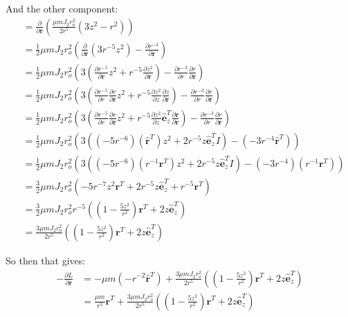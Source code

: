 \documentclass[titlepage]{article}
\begin{document}
And the other component:
\begin{equation}
	\begin{split}
		&=\frac{\partial}{\partial\boldsymbol{r}}\left(\frac{\mu mJ_2r_o^2}{2r^5}\left(3z^2-r^2\right)\right)\\
		&=\frac{1}{2}\mu mJ_2r_o^2\left(\frac{\partial}{\partial\boldsymbol{r}}\left(3r^{-5}z^2\right)-\frac{\partial r^{-3}}{\partial\boldsymbol{r}}\right) \\
		&=\frac{1}{2}\mu mJ_2r_o^2\left(3\left(\frac{\partial r^{-5}}{\partial\boldsymbol{r}}z^2+r^{-5}\frac{\partial z^2}{\partial\boldsymbol{r}}\right)-\frac{\partial r^{-3}}{\partial r}\frac{\partial r}{\partial\boldsymbol{r}}\right) \\
		&=\frac{1}{2}\mu mJ_2r_o^2\left(3\left(\frac{\partial r^{-5}}{\partial r}\frac{\partial r}{\partial\boldsymbol{r}}z^2+r^{-5}\frac{\partial z^2}{\partial z}\frac{\partial z}{\partial\boldsymbol{r}}\right)-\frac{\partial r^{-3}}{\partial r}\frac{\partial r}{\partial\boldsymbol{r}}\right) \\
		&=\frac{1}{2}\mu mJ_2r_o^2\left(3\left(\frac{\partial r^{-5}}{\partial r}\frac{\partial r}{\partial\boldsymbol{r}}z^2+r^{-5}\frac{\partial z^2}{\partial z}\hat{\boldsymbol{e}}_z^T\frac{\partial\boldsymbol{r}}{\partial\boldsymbol{r}}\right)-\frac{\partial r^{-3}}{\partial r}\frac{\partial r}{\partial\boldsymbol{r}}\right) \\
		&=\frac{1}{2}\mu mJ_2r_o^2\left(3\left((-5r^{-6})(\hat{\boldsymbol{r}}^T)z^2+2r^{-5}z\hat{\boldsymbol{e}}_z^TI\right)-(-3r^{-4}\hat{\boldsymbol{r}}^T)\right) \\
		&=\frac{1}{2}\mu mJ_2r_o^2\left(3\left((-5r^{-6})(r^{-1}\boldsymbol{r}^T)z^2+2r^{-5}z\hat{\boldsymbol{e}}_z^TI\right)-(-3r^{-4})(r^{-1}\boldsymbol{r}^T)\right) \\
		&=\frac{3}{2}\mu mJ_2r_o^2\left(-5r^{-7}z^2\boldsymbol{r}^T+2r^{-5}z\hat{\boldsymbol{e}}_z^T+r^{-5}\boldsymbol{r}^T\right) \\
		&=\frac{3}{2}\mu mJ_2r_o^2r^{-5}\left(\left(1-\frac{5z^2}{r^2}\right)\boldsymbol{r}^T+2z\hat{\boldsymbol{e}}_z^T\right) \\
		&=\frac{3\mu mJ_2r_o^2}{2r^5}\left(\left(1-\frac{5z^2}{r^2}\right)\boldsymbol{r}^T+2z\hat{\boldsymbol{e}}_z^T\right)
	\end{split}
\end{equation}

So then that gives:
\begin{equation}
	\begin{split}
		-\frac{\partial L}{\partial\boldsymbol{r}}&=-\mu m\left(-r^{-2}\hat{\boldsymbol{r}}^T\right)+\frac{3\mu mJ_2r_o^2}{2r^5}\left(\left(1-\frac{5z^2}{r^2}\right)\boldsymbol{r}^T+2z\hat{\boldsymbol{e}}_z^T\right)\\
		&=\frac{\mu m}{r^3}\boldsymbol{r}^T+\frac{3\mu mJ_2r_o^2}{2r^5}\left(\left(1-\frac{5z^2}{r^2}\right)\boldsymbol{r}^T+2z\hat{\boldsymbol{e}}_z^T\right)
	\end{split}
\end{equation}
\end{document}
